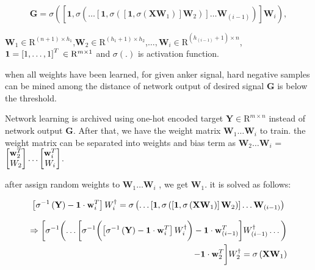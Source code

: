 \documentclass[runningheads]{llncs}
\begin{document}
\begin{equation}
    \mathbf{G} = \sigma\left(\left[\mathbf{1},\sigma\left(\dots\left[\mathbf{1},\sigma\left(\left[\mathbf{1},\sigma\left(\mathbf{X}\mathbf{W}_{1}\right)\right]\mathbf{W}_{2}\right)\right]\dots\mathbf{W}_{(i-1)}\right)\right]\mathbf{W}_{i}\right),
\end{equation}

$\mathbf{W}_{1}\in{\mathrm{R}}^{(n+1) \times h_{1}}$,$\mathbf{W}_{2}\in{\mathrm{R}}^{(h_{1}+1) \times h_{2}}$,$\dots,\mathbf{W}_{i}\in{\mathrm{R}}^{(h_{(i-1)}+1) \times n}$,$\mathbf{1}=\left[1,\dots,1\right]^{T}\\
\in{\mathrm{R}}^{m \times 1}$ and $\sigma(.)$ is activation function.

when all weights have been learned, for given anker signal, hard negative samples can be mined among the distance of network output of desired signal $\mathbf{G}$ is below the threshold.

Network learning is archived using one-hot encoded target $\mathbf{Y}\in{\mathrm{R}}^{m \times n}$ instead of network output $\mathbf{G}$.
After that, we have the weight matrix $\mathbf{W}_{1}\dots\mathbf{W}_{i}$ to train. the weight matrix can be separated into weights and bias term as
$\mathbf{W}_{2}\dots\mathbf{W}_{i}$ = 
$\begin{bmatrix}
\mathbf{w}_{2}^{T}\\\mathnormal{W}_{2}
\end{bmatrix}
\dots
\begin{bmatrix}
\mathbf{w}_{i}^{T}\\\mathnormal{W}_{i}
\end{bmatrix}$.

after assign random weights to $\mathbf{W}_{1}\dots\mathbf{W}_{i}$ , we get $\mathbf{W}_{1}$. it is solved as follows:

\begin{equation}
    \left[\sigma^{-1}\left(\mathbf{Y}\right)-\mathbf{1}\cdot\mathbf{w}_{i}^{T}\right]\mathnormal{W}_{i}^\dagger = 
    \sigma\left(\dots\left[\mathbf{1},\sigma\left(\left[\mathbf{1},\sigma\left(\mathbf{X}\mathbf{W}_{1}\right)\right]\mathbf{W}_{2}\right)\right]\dots\mathbf{W}_{(i-1)}\right)
\end{equation}

\begin{equation}
    \begin{aligned}
        \Rightarrow
        \biggl[\sigma^{-1}\biggl(
        \dots
        \biggl[\sigma^{-1}\biggl(
            \left[\sigma^{-1}\left(\mathbf{Y}\right)-\mathbf{1}\cdot\mathbf{w}_{i}^{T}\right]\mathnormal{W}_{i}^\dagger
        \biggr)
        - \mathbf{1}\cdot\mathbf{w}_{(i-1)}^{T}\biggr]\mathnormal{W}_{(i-1)}^{\dagger}
        \dots\biggr)\\
        - \mathbf{1}\cdot\mathbf{w}_{2}^{T}\biggr]\mathnormal{W}_{2}^{\dagger} 
        = \sigma\left(\mathbf{X}\mathbf{W}_{1}\right)
    \end{aligned}
\end{equation}
\end{document}
